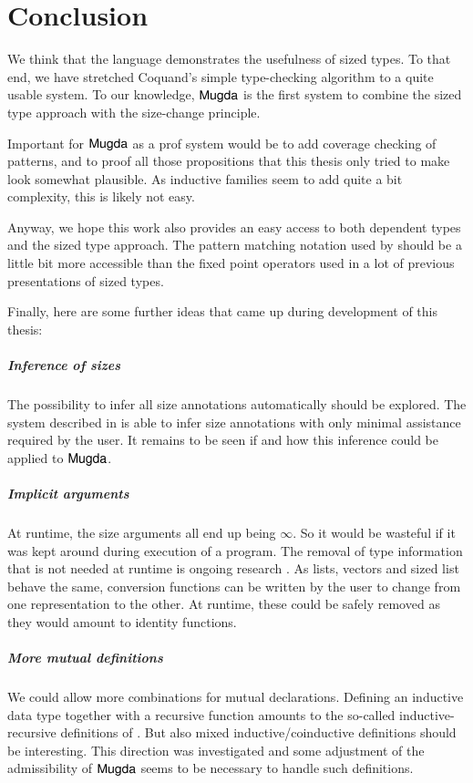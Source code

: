 \chapter{Conclusion}
We think that the \mugda language demonstrates the usefulness of sized types.
To that end, we have stretched Coquand's simple type-checking algorithm to a quite usable system.
To our knowledge, $\textsf{Mugda}$ is the first system to combine the sized type approach with the size-change principle.

Important for $\textsf{Mugda}$ as a prof system would be to add coverage checking of patterns, and to proof all those propositions that this thesis only tried to make look somewhat plausible. As inductive families seem to add quite a bit complexity, this is likely not easy.

Anyway, we hope this work also provides an easy access to both dependent types and the sized type approach. 
The pattern matching notation used by \mugda should be a little bit more accessible than the fixed point operators used in a lot of previous presentations of sized types.

Finally, here are some further ideas that came up during development of this thesis:
\paragraph*{Inference of sizes}
The possibility to infer all size annotations automatically should be explored.
The system described in \cite{bgp:lpar06} is able to infer size annotations with only minimal assistance required by the user. It remains to be seen if and how this inference could be applied to $\textsf{Mugda}$. 
\paragraph*{Implicit arguments}
At runtime, the size arguments all end up being $\infty$.
So it would be wasteful if it was kept around during execution of a program. 
The removal of type information that is not needed at runtime is ongoing research \cite{miquel01implicit,DBLP:conf/types/BradyMM03}. As lists, vectors and sized list behave the same, conversion functions can be written by the user to change from one representation to the other. At runtime, these could be safely removed as they would amount to identity functions.
\paragraph*{More mutual definitions}
We could allow more combinations for mutual declarations.
Defining an inductive data type together with a recursive function amounts to the so-called inductive-recursive definitions of \cite{dybjer01indexed}. But also mixed inductive/coinductive definitions should be interesting. This direction was investigated and some adjustment of the admissibility of $\textsf{Mugda}$ seems to be necessary to handle such definitions.
